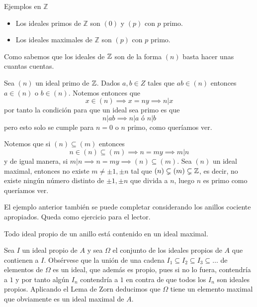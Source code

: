 \begin{example}{Ejemplos en \(\mathbb{Z}\)}{}
    \begin{itemize}
        \item Los ideales primos de \(\mathbb{Z}\) son \((0)\) y \((p)\) con \(p\) primo.
        \item Los ideales maximales de \(\mathbb{Z}\) son \((p)\) con \(p\) primo.
    \end{itemize}
\end{example}

\begin{proofbox}
    Como sabemos que los ideales de $\mathbb{Z}$ son de la forma $(n)$ basta hacer unas cuantas cuentas.

    Sea $(n)$ un ideal primo de $\mathbb{Z}$. Dados $a,b \in Z$ tales que $ab \in (n)$ entonces $a \in (n)$ o $b \in (n)$. Notemos entonces que
    \[
    x \in (n) \implies x = ny \implies n | x
    \]
    por tanto la condición para que un ideal sea primo es que
    \[
    n | ab \implies n | a \text{ ó } n | b
    \]
    pero esto solo se cumple para $n=0$ o $n$ primo, como queríamos ver.

    Notemos que si $(n) \subseteq (m)$ entonces 
    \[
    n \in (n) \subseteq (m) \implies n = my \implies m | n
    \]
    y de igual manera, si $m | n \implies n = my \implies (n) \subseteq (m)$.
    Sea $(n)$ un ideal maximal, entonces no existe $m \neq \pm 1, \pm n$ tal que $(n) \subsetneq (m) \subsetneq \mathbb{Z}$, es decir, no existe ningún número distinto de $\pm 1, \pm n$ que divida a $n$, luego $n$ es primo como queríamos ver.
\end{proofbox}

\begin{remark}
    El ejemplo anterior también se puede completar considerando los anillos cociente apropiados. Queda como ejercicio para el lector.
\end{remark}

\begin{proposition}{}{}
Todo ideal propio de un anillo está contenido en un ideal maximal.
\end{proposition}

\begin{proofbox}
Sea \(I\) un ideal propio de \(A\) y sea \(\Omega\) el conjunto de los ideales propios de \(A\) que contienen a \(I\). Obsérvese que la unión de una cadena \(I_1 \subseteq I_2 \subseteq I_3 \subseteq \ldots\) de elementos de \(\Omega\) es un ideal, que además es propio, pues si no lo fuera, contendría a \(1\) y por tanto algún \(I_n\) contendría a \(1\) en contra de que todos los \(I_n\) son ideales propios. Aplicando el Lema de Zorn deducimos que \(\Omega\) tiene un elemento maximal que obviamente es un ideal maximal de \(A\).
\end{proofbox}


